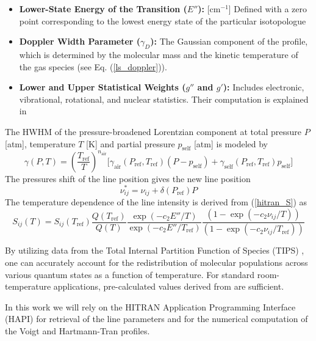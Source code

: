 \documentclass[8pt,a4paper]{report}
\begin{document}
\begin{itemize}
		\item \textbf{Lower-State Energy of the Transition ($E''$):} [cm$^{-1}$] Defined with a zero point corresponding to the lowest energy state of the particular isotopologue
		\item \textbf{Doppler Width Parameter ($\gamma_D$):} The Gaussian component of the profile, which is determined by the molecular mass and the kinetic temperature of the gas species (see Eq. (\ref{ls_doppler})).
		\item \textbf{Lower and Upper Statistical Weights ($g''$ and $g'$):} Includes electronic, vibrational, rotational, and nuclear statistics. Their computation is explained in \cite{hitran_statistical_weights}
	\end{itemize}
	
	The HWHM of the pressure-broadened Lorentzian component at total pressure $P$ [atm], temperature $T$ [K] and partial pressure $p_\mathrm{self}$ [atm] is modeled by
	\begin{equation}
		\gamma(P, T) = \left(\frac{T_\mathrm{ref}}{T}\right)^{n_\mathrm{air}} \Big[
		\gamma_\mathrm{air}(P_\mathrm{ref}, T_\mathrm{ref}) \left(P - p_\mathrm{self}\right) +
		\gamma_\mathrm{self}(P_\mathrm{ref}, T_\mathrm{ref}) p_\mathrm{self}
		\Big]
	\end{equation}
	The pressures shift of the line position gives the new line position
	\begin{equation}
		\nu^*_{ij} = \nu_{ij} + \delta(P_\mathrm{ref}) P
	\end{equation}
	The temperature dependence of the line intensity is derived from (\ref{hitran_S}) as
	\begin{equation}
		S_{ij}(T) = S_{ij}(T_\mathrm{ref}) \frac{Q(T_\mathrm{ref})}{Q(T)}
		\frac{\exp\left(-c_2 E''/T\right)}{\exp\left(-c_2 E''/T_\mathrm{ref}\right)}
		\frac{\left(1 - \exp\left(-c_2 \nu_{ij}/T\right)\right)}{\left(1 - \exp\left(-c_2 \nu_{ij}/T_\mathrm{ref}\right)\right)}
	\end{equation}
	
	By utilizing data from the Total Internal Partition Function of Species (TIPS) \cite{TIPS_2021}, one can accurately account for the redistribution of molecular populations across various quantum states as a function of temperature. For standard room-temperature applications, pre-calculated values derived from \cite{TIPS_2021} are sufficient.
	
	In this work we will rely on the HITRAN Application Programming Interface (HAPI) \cite{HAPI_2016} for retrieval of the line parameters and for the numerical computation of the Voigt and Hartmann-Tran profiles.
	
\end{document}
